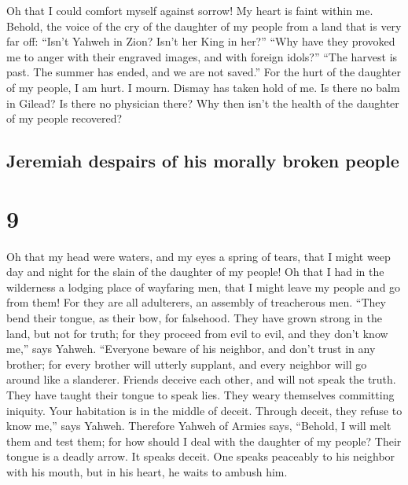  Oh that I could comfort myself against sorrow! My heart
is faint within me.  Behold, the voice of the cry of the
daughter of my people from a land that is very far off: ``Isn't Yahweh
in Zion? Isn't her King in her?'' ``Why have they provoked me to anger
with their engraved images, and with foreign idols?'' 
``The harvest is past. The summer has ended, and we are not saved.''
 For the hurt of the daughter of my people, I am hurt. I
mourn. Dismay has taken hold of me.  Is there no balm in
Gilead? Is there no physician there? Why then isn't the health of the
daughter of my people recovered?

\hypertarget{jeremiah-despairs-of-his-morally-broken-people}{%
\subsection{Jeremiah despairs of his morally broken
people}\label{jeremiah-despairs-of-his-morally-broken-people}}

\hypertarget{section-8}{%
\section{9}\label{section-8}}

 Oh that my head were waters, and my eyes a spring of
tears, that I might weep day and night for the slain of the daughter of
my people!  Oh that I had in the wilderness a lodging
place of wayfaring men, that I might leave my people and go from them!
For they are all adulterers, an assembly of treacherous men.
 ``They bend their tongue, as their bow, for falsehood.
They have grown strong in the land, but not for truth; for they proceed
from evil to evil, and they don't know me,'' says Yahweh. 
``Everyone beware of his neighbor, and don't trust in any brother; for
every brother will utterly supplant, and every neighbor will go around
like a slanderer.  Friends deceive each other, and will
not speak the truth. They have taught their tongue to speak lies. They
weary themselves committing iniquity.  Your habitation is
in the middle of deceit. Through deceit, they refuse to know me,'' says
Yahweh.  Therefore Yahweh of Armies says, ``Behold, I will
melt them and test them; for how should I deal with the daughter of my
people?  Their tongue is a deadly arrow. It speaks deceit.
One speaks peaceably to his neighbor with his mouth, but in his heart,
he waits to ambush him.

